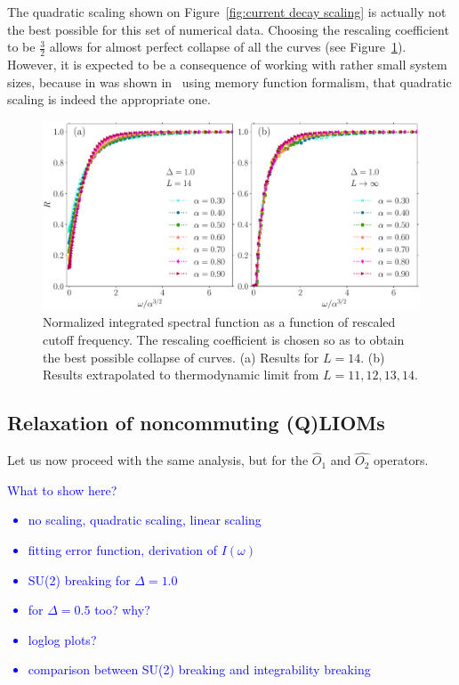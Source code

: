 The quadratic scaling shown on Figure~\ref{fig:current decay scaling} is actually not the
best possible for this set of numerical data. Choosing the rescaling coefficient to be
\(\frac{3}{2}\) allows for almost perfect collapse of all the curves 
(see Figure~\ref{fig:current decay perfect scaling}). However, it is expected to be a consequence
of working with rather small system sizes, because in was shown 
in~\textcite{Mierzejewski2015Approx} using memory function formalism, that quadratic scaling
is indeed the appropriate one.
\begin{figure}[htbp]
  \centering
  \includegraphics[width=\textwidth]{Figures/current_perfect_scaling.pdf}
  \caption{Normalized integrated spectral function as a function of 
  rescaled cutoff frequency. The rescaling coefficient is chosen so as to obtain the 
  best possible collapse of curves. (a) Results for \(L=14\). (b) Results extrapolated
   to thermodynamic limit from \(L=11,12,13,14\).}\label{fig:current decay perfect scaling}
\end{figure}



\subsection{Relaxation of noncommuting (Q)LIOMs}
Let us now proceed with the same analysis, but for the \(\hat{O}_1\) and \(\hat{O_2}\)
operators.

\textcolor{blue}{What to show here?
\begin{itemize}
  \item no scaling, quadratic scaling, linear scaling
  \item fitting error function, derivation of \(I(\omega)\)
  \item SU(2) breaking for \(\Delta=1.0\)
  \item for \(\Delta = 0.5\) too? why?
  \item loglog plots?
  \item comparison between SU(2) breaking and integrability breaking
\end{itemize}
}